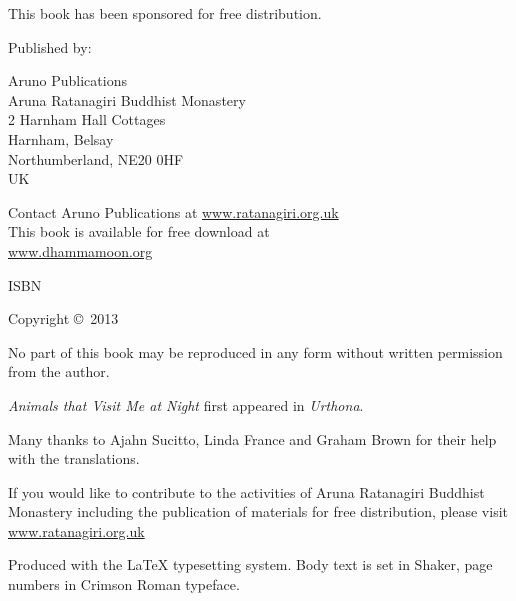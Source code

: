 {\small\setlength{\parskip}{0.8em}\setlength{\parindent}{0em}%
{\raggedright%

This book has been sponsored for free distribution.

Published by:

Aruno Publications\\
Aruna Ratanagiri Buddhist Monastery\\
2 Harnham Hall Cottages\\
Harnham, Belsay\\
Northumberland, NE20 0HF\\
UK

Contact Aruno Publications at \href{http://ratanagiri.org.uk}{www.ratanagiri.org.uk}\\
This book is available for free download at\\
\href{http://dhammamoon.org/}{www.dhammamoon.org}

ISBN \theISBN

Copyright \copyright\ 2013 \theauthor

No part of this book may be reproduced in any form without written permission from the author.

\vfill

\textit{Animals that Visit Me at Night} first appeared in \textit{Urthona}.

Many thanks to Ajahn Sucitto, Linda France and Graham Brown for their help with the translations.

If you would like to contribute to the activities of Aruna Ratanagiri Buddhist Monastery including the publication of materials for free distribution, please visit \href{http://ratanagiri.org.uk/}{www.ratanagiri.org.uk}

{\footnotesize
Produced with the {\selectfont\LaTeX} typesetting system. Body text is set in Shaker, page numbers in Crimson Roman typeface.

\theEditionInfo

}

}}

